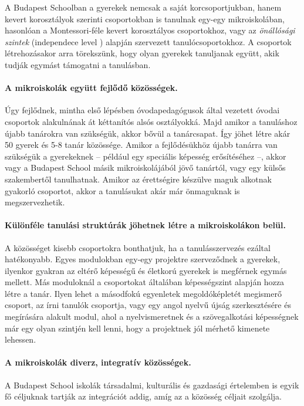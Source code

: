     A Budapest Schoolban a gyerekek nemcsak a saját korcsoportjukban, hanem kevert korosztályok szerinti csoportokban is tanulnak egy-egy mikroiskolában, hasonlóan a Montessori-féle kevert korosztályos csoportokhoz, vagy az \emph{önállósági szintek} (independece level  \citep{indepence_level}) alapján szervezett tanulócsoportokhoz. A csoportok létrehozásakor arra törekszünk, hogy olyan gyerekek tanuljanak együtt, akik tudják egymást támogatni a tanulásban.

  \paragraph{A mikroiskolák együtt fejlődő közösségek.}

    Úgy fejlődnek, mintha első lépésben óvodapedagógusok által vezetett óvodai csoportok
    alakulnának át kéttanítós alsós osztályokká. Majd amikor a tanuláshoz újabb
    tanárokra van szükségük, akkor bővül a tanárcsapat. Így jöhet létre akár 50 gyerek és 5-8
    tanár közössége. Amikor a fejlődésükhöz újabb tanárra van szükségük a
    gyerekeknek -- például egy speciális képesség erősítéséhez --, akkor vagy a
    Budapest School másik mikroiskolájából jövő tanártól, vagy egy külsős szakembertől
    tanulhatnak. Amikor az érettségire készülve maguk alkotnak gyakorló csoportot, akkor a tanulásukat akár már önmaguknak is megszervezhetik.

  \paragraph{Különféle tanulási struktúrák jöhetnek létre a mikroiskolákon belül.}

    A közösséget kisebb csoportokra bonthatjuk, ha a tanulásszervezés ezáltal
    hatékonyabb. Egyes modulokban egy-egy projektre szerveződnek a gyerekek,
    ilyenkor gyakran az eltérő képességű és életkorú gyerekek is megférnek egymás
    mellett. Más moduloknál a csoportokat általában képességszint alapján hozza
    létre a tanár. Ilyen lehet a másodfokú egyenletek megoldóképletét megismerő
    csoport, az írni tanulók csoportja, vagy egy angol nyelvű újság szerkesztésére
    és megírására alakult modul, ahol a nyelvismeretnek és a szövegalkotási
    képességnek már egy olyan szintjén kell lenni, hogy a projektnek jól mérhető
    kimenete lehessen.

  \paragraph{A mikroiskolák diverz, integratív közösségek.} A Budapest School iskolák társadalmi,
  kulturális és gazdasági értelemben is egyik fő céljuknak tartják az integrációt addig,
  amíg az a közösség céljait szolgálja.


